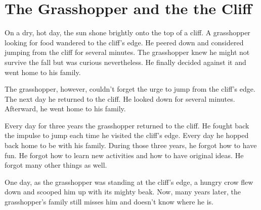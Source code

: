 \chapter{The Grasshopper and the the Cliff}

On a dry, hot day, the sun shone brightly onto the top of a cliff. A grasshopper looking for food wandered to the cliff's edge. He peered down and considered jumping from the cliff for several minutes. The grasshopper knew he might not survive the fall but was curious nevertheless. He finally decided against it and went home to his family.

The grasshopper, however, couldn't forget the urge to jump from the cliff's edge. The next day he returned to the cliff. He looked down for several minutes. Afterward, he went home to his family.

Every day for three years the grasshopper returned to the cliff. He fought back the impulse to jump each time he visited the cliff's edge. Every day he hopped back home to be with his family. During those three years, he forgot how to have fun. He forgot how to learn new activities and how to have original ideas. He forgot many other things as well.

One day, as the grasshopper was standing at the cliff's edge, a hungry crow flew down and scooped him up with its mighty beak. Now, many years later, the grasshopper's family still misses him and doesn't know where he is.